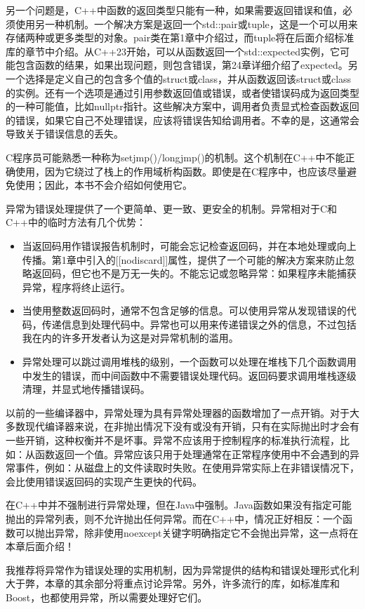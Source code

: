 另一个问题是，C++中函数的返回类型只能有一种，如果需要返回错误和值，必须使用另一种机制。一个解决方案是返回一个std::pair或tuple，这是一个可以用来存储两种或更多类型的对象。pair类在第1章中介绍过，而tuple将在后面介绍标准库的章节中介绍。从C++23开始，可以从函数返回一个std::expected实例，它可能包含函数的结果，如果出现问题，则包含错误，第24章详细介绍了expected。另一个选择是定义自己的包含多个值的struct或class，并从函数返回该struct或class的实例。还有一个选项是通过引用参数返回值或错误，或者使错误码成为返回类型的一种可能值，比如nullptr指针。这些解决方案中，调用者负责显式检查函数返回的错误，如果它自己不处理错误，应该将错误告知给调用者。不幸的是，这通常会导致关于错误信息的丢失。

C程序员可能熟悉一种称为setjmp()/longjmp()的机制。这个机制在C++中不能正确使用，因为它绕过了栈上的作用域析构函数。即使是在C程序中，也应该尽量避免使用；因此，本书不会介绍如何使用它。

异常为错误处理提供了一个更简单、更一致、更安全的机制。异常相对于C和C++中的临时方法有几个优势：

\begin{itemize}
\item
当返回码用作错误报告机制时，可能会忘记检查返回码，并在本地处理或向上传播。第1章中引入的[[nodiscard]]属性，提供了一个可能的解决方案来防止忽略返回码，但它也不是万无一失的。不能忘记或忽略异常：如果程序未能捕获异常，程序将终止运行。

\item
当使用整数返回码时，通常不包含足够的信息。可以使用异常从发现错误的代码，传递信息到处理代码中。异常也可以用来传递错误之外的信息，不过包括我在内的许多开发者认为这是对异常机制的滥用。

\item
异常处理可以跳过调用堆栈的级别，一个函数可以处理在堆栈下几个函数调用中发生的错误，而中间函数中不需要错误处理代码。返回码要求调用堆栈逐级清理，并显式地传播错误码。
\end{itemize}

以前的一些编译器中，异常处理为具有异常处理器的函数增加了一点开销。对于大多数现代编译器来说，在非抛出情况下没有或没有开销，只有在实际抛出时才会有一些开销，这种权衡并不是坏事。异常不应该用于控制程序的标准执行流程，比如：从函数返回一个值。异常应该只用于处理通常在正常程序使用中不会遇到的异常事件，例如：从磁盘上的文件读取时失败。在使用异常实际上在非错误情况下，会比使用错误返回码的实现产生更快的代码。

在C++中并不强制进行异常处理，但在Java中强制。Java函数如果没有指定可能抛出的异常列表，则不允许抛出任何异常。而在C++中，情况正好相反：一个函数可以抛出异常，除非使用noexcept关键字明确指定它不会抛出异常，这一点将在本章后面介绍！


我推荐将异常作为错误处理的实用机制，因为异常提供的结构和错误处理形式化利大于弊，本章的其余部分将重点讨论异常。另外，许多流行的库，如标准库和Boost，也都使用异常，所以需要处理好它们。








